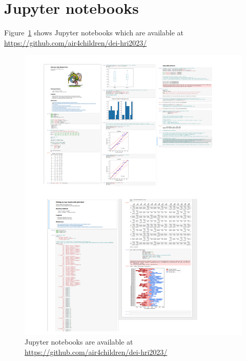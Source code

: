 \documentclass[sigconf]{acmart}
\begin{document}
\section*{Jupyter notebooks}
Figure~\ref{fig:notebooks} shows Jupyter notebooks which are available at \\ \url{https://github.com/air4children/dei-hri2023/}
\begin{figure}[h]
  \centering
    \includegraphics[width=\linewidth]{../figures/jupyter-notebooks/outputs/drawing-v00.png}  %
    \caption{
    Jupyter notebooks are available at \url{https://github.com/air4children/dei-hri2023/}
    }
    \label{fig:notebooks}
\end{figure}

%

%
%
\end{document}
